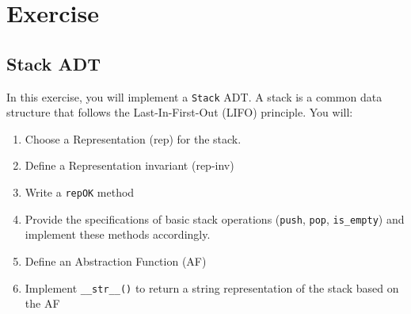 \documentclass[oneside,11pt,dvipsnames]{book}
\newcommand{\code}[1]{\texttt{#1}}
\begin{document}

\section{Exercise}

\subsection{Stack ADT}\label{exercise:stack-adt}

In this exercise, you will implement a \code{Stack} ADT. A stack is a common data structure that follows the Last-In-First-Out (LIFO) principle. You will:
\begin{enumerate}
\item Choose a Representation (rep) for the stack.
\item Define a Representation invariant (rep-inv)
\item Write a \code{repOK} method
\item Provide the specifications of basic stack operations (\code{push}, \code{pop}, \code{is\_empty}) and implement these methods accordingly.
\item Define an Abstraction Function (AF)
\item Implement \code{\_\_str\_\_()} to return a string representation of the stack based on the AF
\end{enumerate}
\end{document}
